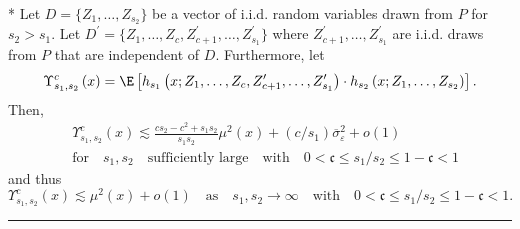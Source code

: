 \newpage
\begin{lem}\label{lem:upsilon_sc}\mbox{}\\*
	Let $D = \{Z_1, \dotsc, Z_{s_2}\}$ be a vector of i.i.d. random variables drawn from $P$ for $s_2 > s_1$.
	Let $D^{\prime} = \{Z_1, \dotsc, Z_{c}, Z_{c+1}^{\prime}, \dotsc,  Z_{s_1}^{\prime}\}$ where $Z_{c+1}^{\prime}, \dotsc,  Z_{s_1}^{\prime}$ are i.i.d. draws from $P$ that are independent of $D$.
	Furthermore, let
	\begin{equation}
		\Upsilon_{s_1, s_2}^{c}\left(x\right)
		= \E\left[h_{s_1}\left(x; Z_1, \ldots, Z_c, Z^{\prime}_{c+1}, \ldots,  Z^{\prime}_{s_1}\right) \cdot
			h_{s_2}\left(x; Z_1, \ldots, Z_{s_2}\right)\right].
	\end{equation}
	Then,
	\begin{equation}
		\begin{aligned}
			 & \Upsilon_{s_1, s_2}^{c}\left(x\right)
			\lesssim \frac{c s_2 - c^2 + s_1 s_2}{s_1 s_2}\mu^2(x) + (c/s_1) \overline{\sigma}^2_{\varepsilon} + o(1) \\
			 & \text{for} \quad s_1, s_2 \quad \text{sufficiently large}
			\quad \text{with} \quad
			0 < \mathfrak{c} \leq s_1 / s_2 \leq 1 - \mathfrak{c} < 1
		\end{aligned}
	\end{equation}
	and thus
	\begin{equation}
		\Upsilon_{s_1, s_2}^{c}\left(x\right)
		\lesssim \mu^2(x) + o(1)
		\quad \text{as} \quad s_1, s_2 \rightarrow \infty
		\quad \text{with} \quad
		0 < \mathfrak{c} \leq s_1 / s_2 \leq 1 - \mathfrak{c} < 1.
	\end{equation}
\end{lem}
\hrule
